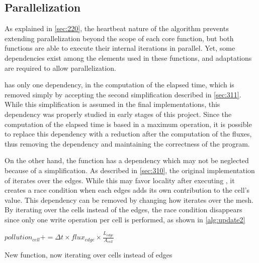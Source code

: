 \subsection{Parallelization}

As explained in \cref{sec:220}, the heartbeat nature of the algorithm prevents extending parallelization beyond the scope of each core function, but both functions are able to execute their internal iterations in parallel. Yet, some dependencies exist among the elements used in these functions, and adaptations are required to allow parallelization.


\computeflux has only one dependency, in the computation of the elapsed time, which is removed simply by accepting the second simplification described in \cref{sec:311}. While this simplification is assumed in the final implementations, this dependency was properly studied in early stages of this project. Since the computation of the elapsed time is based in a maximum operation, it is possible to replace this dependency with a reduction  after the computation of the fluxes, thus removing the dependency and maintaining the correctness of the program.

On the other hand, the \update function has a dependency which may not be neglected because of a simplification. As described in \cref{sec:310}, the original implementation of \update iterates over the edges. While this may favor locality after executing \computeflux, it creates a race condition when each edges adds its own contribution to the cell's value. This dependency can be removed by changing how \update iterates over the mesh. By iterating over the cells instead of the edges, the race condition disappears since only one write operation per cell is performed, as shown in \cref{alg:update2}

\begin{algorithm}[!htp]
	\begin{algorithmic}

				$pollution_{cell} += \Delta{t} \times flux_{edge} \times \frac{L_{edge}}{A_{cell}}$
			\EndFor
		\EndFor
	\end{algorithmic}

	\caption{New \update function, now iterating over cells instead of edges}
	\label{alg:update2}
\end{algorithm}
